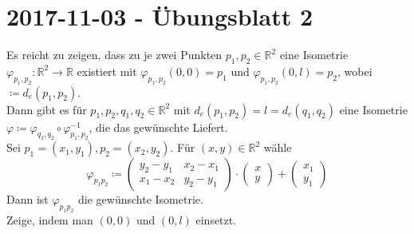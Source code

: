 \section{2017-11-03 - Übungsblatt 2}
\begin{problem*}[1a]
Es reicht zu zeigen, dass zu je zwei Punkten $ p_1, p_2 \in \mathbb{R}^2$ eine Isometrie $\varphi_{ p_1,p_2 }: \mathbb{R}^2 \to \mathbb{R}$ existiert mit $ \varphi_{ p_1,p_2 }(0,0) = p_1 $ und
$\varphi_{ p_1,p_2 }(0,l) = p_2$, wobei $ \coloneqq d_e(p_1,p_2) $.\\
Dann gibt es für $ p_1,p_2,q_1,q_2 \in \mathbb{R}^2 $ mit $ d_e(p_1,p_2) = l = d_e(q_1,q_2)$ eine Isometrie $ \varphi \coloneqq \varphi_{ q_1,q_2 } \circ \varphi_{ p_1,p_2 }^{ -1 } $, die das gewünschte Liefert.\\  
Sei $p_1 = (x_1,y_1), p_2 = (x_2, y_2) $. Für $ (x,y) \in \mathbb{R}^2 $ wähle
\begin{equation*}
\varphi_{ p_1p_2} \coloneqq \begin{pmatrix}
	y_2-y_1 & x_2 - x_1 \\
	x_1 - x_2 & y_2 -y_1
\end{pmatrix}\cdot
\begin{pmatrix}
x\\
y	
\end{pmatrix} + 
\begin{pmatrix}
x_1\\
y_1
\end{pmatrix}
\end{equation*}
Dann ist $ \varphi_{ p_1p_2 } $ die gewünschte Isometrie.\\
Zeige, indem man $(0,0)$ und $ (0,l) $ einsetzt.
\end{problem*}


